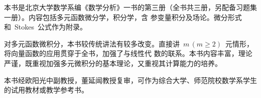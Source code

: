 

\begin{summary}
本书是北京大学数学系编《数学分析》一书的第三册（全书共三册，另配备习题集一册）。内容包括多元函数微分学，积分学，含
参变量积分及场论。微分形式和~Stokes~公式作为附录。

对多元函数微积分，本书较传统讲法有较多改变。直接讲~$m\,(m\geq 2)$~元情形，将向量函数的应用贯穿于全书，加强了与线性代
数的联系。本书内容丰富，理论严谨，既重视加强多元微积分的基本理论，又重视其计算能力的培养。

本书经欧阳光中副教授，董延闿教授复审，可作为综合大学、师范院校数学系学生的试用教材或教学参考书。
\end{summary}

\MakeVolume*

\volfrontmatter



\VolumeTOC

\volmainmatter











\begin{appendix}

\end{appendix}

\endinput
